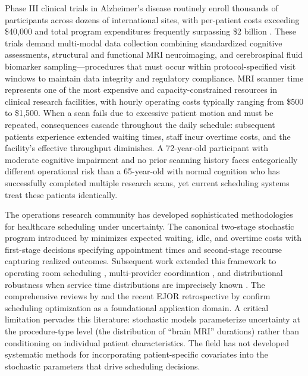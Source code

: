 \documentclass[11pt,a4paper]{article}
\begin{document}
Phase III clinical trials in Alzheimer's disease routinely enroll thousands of participants across dozens of international sites, with per-patient costs exceeding \$40,000 and total program expenditures frequently surpassing \$2 billion \citep{cummings2014clinical}. These trials demand multi-modal data collection combining standardized cognitive assessments, structural and functional MRI neuroimaging, and cerebrospinal fluid biomarker sampling---procedures that must occur within protocol-specified visit windows to maintain data integrity and regulatory compliance. MRI scanner time represents one of the most expensive and capacity-constrained resources in clinical research facilities, with hourly operating costs typically ranging from \$500 to \$1,500. When a scan fails due to excessive patient motion and must be repeated, consequences cascade throughout the daily schedule: subsequent patients experience extended waiting times, staff incur overtime costs, and the facility's effective throughput diminishes. A 72-year-old participant with moderate cognitive impairment and no prior scanning history faces categorically different operational risk than a 65-year-old with normal cognition who has successfully completed multiple research scans, yet current scheduling systems treat these patients identically.

The operations research community has developed sophisticated methodologies for healthcare scheduling under uncertainty. The canonical two-stage stochastic program introduced by \citet{denton2003sequential} minimizes expected waiting, idle, and overtime costs with first-stage decisions specifying appointment times and second-stage recourse capturing realized outcomes. Subsequent work extended this framework to operating room scheduling \citep{cardoen2010operating, denton2010optimal}, multi-provider coordination \citep{gul2015progressive}, and distributional robustness when service time distributions are imprecisely known \citep{shehadeh2021distributionally}. The comprehensive reviews by \citet{ahmadi2017outpatient} and the recent EJOR retrospective by \citet{belien2025fifty} confirm scheduling optimization as a foundational application domain. A critical limitation pervades this literature: stochastic models parameterize uncertainty at the procedure-type level (the distribution of ``brain MRI'' durations) rather than conditioning on individual patient characteristics. The field has not developed systematic methods for incorporating patient-specific covariates into the stochastic parameters that drive scheduling decisions.
\end{document}
